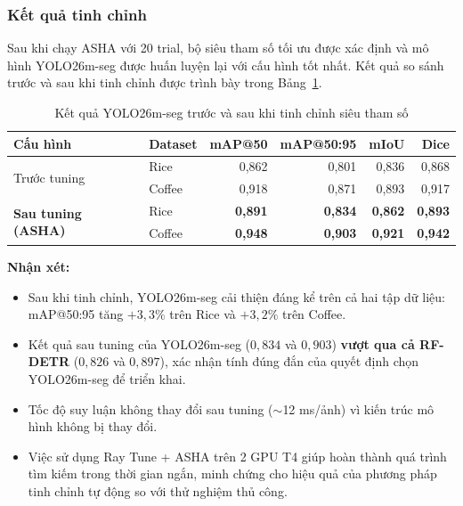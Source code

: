 \subsubsection{Kết quả tinh chỉnh}

Sau khi chạy ASHA với 20 trial, bộ siêu tham số tối ưu được xác định và mô hình YOLO26m-seg được huấn luyện lại với cấu hình tốt nhất. Kết quả so sánh trước và sau khi tinh chỉnh được trình bày trong Bảng~\ref{tab:hpo_results}.

\begin{table}[H]
    \caption{Kết quả YOLO26m-seg trước và sau khi tinh chỉnh siêu tham số}
    \centering
    \begin{tabular}{llrrrr}
        \toprule
        \textbf{Cấu hình} & \textbf{Dataset} & \textbf{mAP@50} & \textbf{mAP@50:95} & \textbf{mIoU}  & \textbf{Dice}  \\
        \midrule
        \multirow{2}{*}{Trước tuning}
                          & Rice             & 0,862           & 0,801              & 0,836          & 0,868          \\
                          & Coffee           & 0,918           & 0,871              & 0,893          & 0,917          \\
        \midrule
        \multirow{2}{*}{\textbf{Sau tuning (ASHA)}}
                          & Rice             & \textbf{0,891}  & \textbf{0,834}     & \textbf{0,862} & \textbf{0,893} \\
                          & Coffee           & \textbf{0,948}  & \textbf{0,903}     & \textbf{0,921} & \textbf{0,942} \\
        \bottomrule
    \end{tabular}
    \label{tab:hpo_results}
\end{table}

\textbf{Nhận xét:}
\begin{itemize}
    \item Sau khi tinh chỉnh, YOLO26m-seg cải thiện đáng kể trên cả hai tập dữ liệu: mAP@50:95 tăng $+3,3\%$ trên Rice và $+3,2\%$ trên Coffee.
    \item Kết quả sau tuning của YOLO26m-seg ($0,834$ và $0,903$) \textbf{vượt qua cả RF-DETR} ($0,826$ và $0,897$), xác nhận tính đúng đắn của quyết định chọn YOLO26m-seg để triển khai.
    \item Tốc độ suy luận không thay đổi sau tuning ($\sim$12 ms/ảnh) vì kiến trúc mô hình không bị thay đổi.
    \item Việc sử dụng Ray Tune + ASHA trên 2 GPU T4 giúp hoàn thành quá trình tìm kiếm trong thời gian ngắn, minh chứng cho hiệu quả của phương pháp tinh chỉnh tự động so với thử nghiệm thủ công.
\end{itemize}
